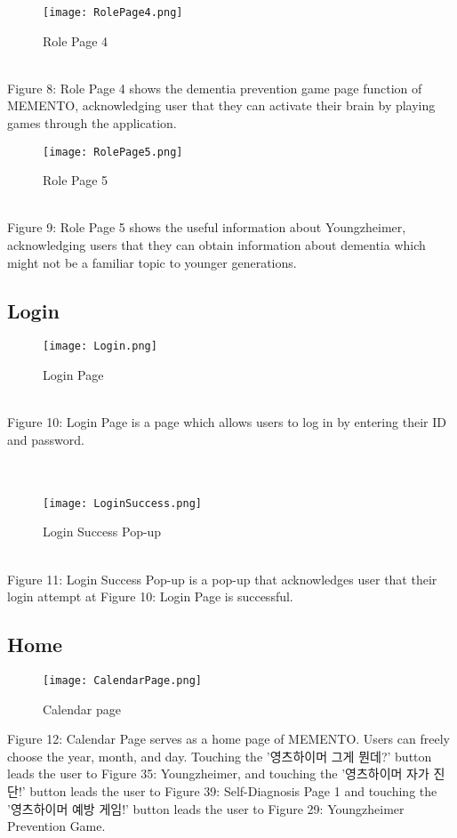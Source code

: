 \documentclass[conference]{IEEEtran}
\begin{document}
\begin{figure}[h]
\centerline{\texttt{[image: RolePage4.png]}}
\caption{Role Page 4}
\label{fig}
\end{figure}
\\Figure 8: Role Page 4 shows the dementia prevention game page function of MEMENTO, acknowledging user that they can activate their brain by playing games through the application.

\clearpage
\begin{figure}[h]
\centerline{\texttt{[image: RolePage5.png]}}
\caption{Role Page 5}
\label{fig}
\end{figure}
\\
Figure 9: Role Page 5 shows the useful information about Youngzheimer, acknowledging users that they can obtain information about dementia which might not be a familiar topic to younger generations.
\\
\subsection{Login}
\begin{figure}[h]
\centerline{\texttt{[image: Login.png]}}
\caption{Login Page}
\label{fig}
\end{figure}
\\
Figure 10: Login Page is a page which allows users to log in by entering their ID and password.
\\\\\\
\begin{figure}[h]
\centerline{\texttt{[image: LoginSuccess.png]}}
\caption{Login Success Pop-up}
\label{fig}
\end{figure}
\\
\indent Figure 11: Login Success Pop-up is a pop-up that acknowledges user that their login attempt at Figure 10: Login Page is successful.
\\
\subsection{Home}
\begin{figure}[h]
\centerline{\texttt{[image: CalendarPage.png]}}
\caption{Calendar page}
\label{fig}
\end{figure}
Figure 12: Calendar Page serves as a home page of MEMENTO. Users can freely choose the year, month, and day. Touching the '영츠하이머 그게 뭔데?' button leads the user to Figure 35: Youngzheimer, and touching the '영츠하이머 자가 진단!' button leads the user to Figure 39: Self-Diagnosis Page 1 and touching the '영츠하이머 예방 게임!' button leads the user to Figure 29: Youngzheimer Prevention Game. 
\end{document}
